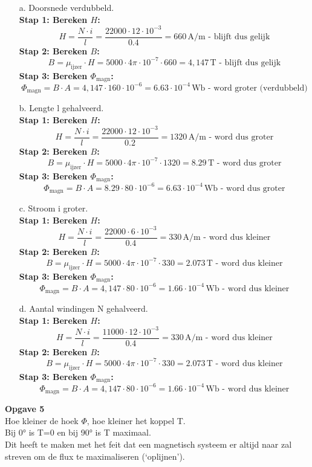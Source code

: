 \begin{enumerate}
    \item [a.]Doorsnede verdubbeld.\\
        \textbf{Stap 1: Bereken \( H \):} 
        \[ H = 
            \frac{N \cdot i}{l} = \frac{22000 \cdot 12 \cdot 10^{-3}}{0.4} = 660 \, \text{A/m - blijft dus gelijk} \]
        \textbf{Stap 2: Bereken \( B \):} 
        \[ B = 
            \mu_{\text{ijzer}} \cdot H = 5000 \cdot 4\pi \cdot 10^{-7} \cdot 660 = 4,147 \, \text{T - blijft dus gelijk} \]
        \textbf{Stap 3: Bereken \( \Phi_{\text{magn}} \):} 
        \[ \Phi_{\text{magn}} = 
            B \cdot A = 4,147 \cdot 160 \cdot 10^{-6} = 6.63 \cdot 10^{-4} \, \text{Wb - word groter (verdubbeld)} \]

    \item [b.]Lengte l gehalveerd.\\
        \textbf{Stap 1: Bereken \( H \):} 
        \[ H = 
            \frac{N \cdot i}{l} = \frac{22000 \cdot 12 \cdot 10^{-3}}{0.2} = 1320 \, \text{A/m - word dus groter} \]
        \textbf{Stap 2: Bereken \( B \):} 
        \[ B = 
            \mu_{\text{ijzer}} \cdot H = 5000 \cdot 4\pi \cdot 10^{-7} \cdot 1320 = 8.29 \, \text{T - word dus groter} \]
        \textbf{Stap 3: Bereken \( \Phi_{\text{magn}} \):} 
        \[ \Phi_{\text{magn}} = 
            B \cdot A = 8.29 \cdot 80 \cdot 10^{-6} = 6.63 \cdot 10^{-4} \, \text{Wb - word dus groter} \]
    
    \item [c.]Stroom i groter.\\
        \textbf{Stap 1: Bereken \( H \):} 
        \[ H = 
            \frac{N \cdot i}{l} = \frac{22000 \cdot 6 \cdot 10^{-3}}{0.4} = 330 \, \text{A/m - word dus kleiner} \]
        \textbf{Stap 2: Bereken \( B \):} 
        \[ B = 
            \mu_{\text{ijzer}} \cdot H = 5000 \cdot 4\pi \cdot 10^{-7} \cdot 330 = 2.073 \, \text{T - word dus kleiner} \]
        \textbf{Stap 3: Bereken \( \Phi_{\text{magn}} \):} 
        \[ \Phi_{\text{magn}} = 
            B \cdot A = 4,147 \cdot 80 \cdot 10^{-6} = 1.66 \cdot 10^{-4} \, \text{Wb - word dus kleiner} \]
    
     \item [d.]Aantal windingen N gehalveerd.\\
        \textbf{Stap 1: Bereken \( H \):} 
        \[ H = 
            \frac{N \cdot i}{l} = \frac{11000 \cdot 12 \cdot 10^{-3}}{0.4} = 330 \, \text{A/m - word dus kleiner} \]
        \textbf{Stap 2: Bereken \( B \):} 
        \[ B = 
            \mu_{\text{ijzer}} \cdot H = 5000 \cdot 4\pi \cdot 10^{-7} \cdot 330 = 2.073 \, \text{T - word dus kleiner} \]
        \textbf{Stap 3: Bereken \( \Phi_{\text{magn}} \):} 
        \[ \Phi_{\text{magn}} = 
            B \cdot A = 4,147 \cdot 80 \cdot 10^{-6} = 1.66 \cdot 10^{-4} \, \text{Wb - word dus kleiner} \]
\end{enumerate}

\newpage
\textbf{Opgave 5}\\
Hoe kleiner de hoek \( \Phi \), hoe kleiner het koppel T.\\
Bij 0° is T=0 en bij 90° is T maximaal.\\
Dit heeft te maken met het feit dat een magnetisch systeem er altijd naar zal streven om de flux te maximaliseren (‘oplijnen’).



